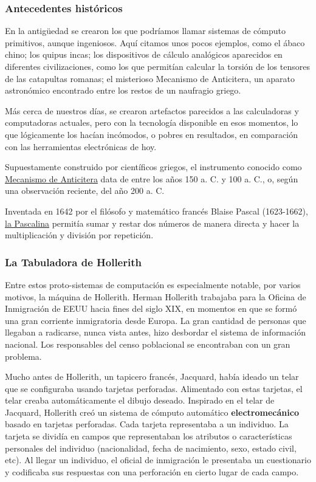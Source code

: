 \documentclass[spanish,A4,]{article}
\begin{document}
\subsubsection{Antecedentes
históricos}\label{antecedentes-histuxf3ricos}

En la antigüedad se crearon los que podríamos llamar sistemas de cómputo
primitivos, aunque ingeniosos. Aquí citamos unos pocos ejemplos, como el
ábaco chino; los quipus incas; los dispositivos de cálculo analógicos
aparecidos en diferentes civilizaciones, como los que permitían calcular
la torsión de los tensores de las catapultas romanas; el misterioso
Mecanismo de Anticitera, un aparato astronómico encontrado entre los
restos de un naufragio griego.

Más cerca de nuestros días, se crearon artefactos parecidos a las
calculadoras y computadoras actuales, pero con la tecnología disponible
en esos momentos, lo que lógicamente los hacían incómodos, o pobres en
resultados, en comparación con las herramientas electrónicas de hoy.

Supuestamente construido por científicos griegos, el instrumento
conocido como
\href{https://es.m.wikipedia.org/wiki/Mecanismo_de_Anticitera}{Mecanismo
de Anticitera} data de entre los años 150 a. C. y 100 a. C., o, según
una observación reciente, del año 200 a. C.

Inventada en 1642 por el filósofo y matemático francés Blaise Pascal
(1623-1662), \href{https://es.m.wikipedia.org/wiki/Pascalina}{la
Pascalina} permitía sumar y restar dos números de manera directa y hacer
la multiplicación y división por repetición.

\subsubsection{La Tabuladora de
Hollerith}\label{la-tabuladora-de-hollerith}

Entre estos proto-sistemas de computación es especialmente notable, por
varios motivos, la máquina de Hollerith. Herman Hollerith trabajaba para
la Oficina de Inmigración de EEUU hacia fines del siglo XIX, en momentos
en que se formó una gran corriente inmigratoria desde Europa. La gran
cantidad de personas que llegaban a radicarse, nunca vista antes, hizo
desbordar el sistema de información nacional. Los responsables del censo
poblacional se encontraban con un gran problema.

Mucho antes de Hollerith, un tapicero francés, Jacquard, había ideado un
telar que se configuraba usando tarjetas perforadas. Alimentado con
estas tarjetas, el telar creaba automáticamente el dibujo deseado.
Inspirado en el telar de Jacquard, Hollerith creó un sistema de cómputo
automático \textbf{electromecánico} basado en tarjetas perforadas. Cada
tarjeta representaba a un individuo. La tarjeta se dividía en campos que
representaban los atributos o características personales del individuo
(nacionalidad, fecha de nacimiento, sexo, estado civil, etc). Al llegar
un individuo, el oficial de inmigración le presentaba un cuestionario y
codificaba sus respuestas con una perforación en cierto lugar de cada
campo.
\end{document}
